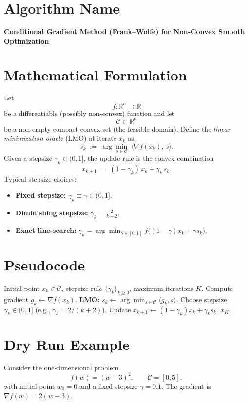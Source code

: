 \documentclass{article}
\begin{document}
\section*{Algorithm Name}
\textbf{Conditional Gradient Method (Frank–Wolfe) for Non‑Convex Smooth Optimization}

\section*{Mathematical Formulation}
Let 
\[
f:\mathbb{R}^{n}\rightarrow\mathbb{R}
\]
be a differentiable (possibly non‑convex) function and let 
\[
\mathcal{C}\subset\mathbb{R}^{n}
\]
be a non‑empty compact convex set (the feasible domain).  
Define the \emph{linear minimization oracle} (LMO) at iterate $x_k$ as
\[
s_k \;:=\; \arg\min_{s\in\mathcal{C}}\;\langle \nabla f(x_k),\,s\rangle .
\tag{1}
\]
Given a stepsize $\gamma_k\in(0,1]$, the update rule is the convex combination
\[
x_{k+1}\;=\;(1-\gamma_k)\,x_k+\gamma_k\,s_k .
\tag{2}
\]
Typical stepsize choices:
\begin{itemize}
\item \textbf{Fixed stepsize:} $\gamma_k\equiv\gamma\in(0,1]$.
\item \textbf{Diminishing stepsize:} $\displaystyle \gamma_k=\frac{2}{k+2}$.
\item \textbf{Exact line‑search:} $\displaystyle \gamma_k=\arg\min_{\gamma\in[0,1]} f\!\big((1-\gamma)x_k+\gamma s_k\big)$.
\end{itemize}

\section*{Pseudocode}
\begin{algorithm}[H]
\caption{Frank–Wolfe for Non‑Convex Smooth Problems}
\begin{algorithmic}[1]
\REQUIRE Initial point $x_0\in\mathcal{C}$, stepsize rule $\{\gamma_k\}_{k\ge 0}$, maximum iterations $K$.
    \STATE Compute gradient $g_k \gets \nabla f(x_k)$.
    \STATE \textbf{LMO:} $s_k \gets \arg\min_{s\in\mathcal{C}}\langle g_k, s\rangle$.
    \STATE Choose stepsize $\gamma_k\in(0,1]$ (e.g., $\gamma_k=2/(k+2)$).
    \STATE Update $x_{k+1}\gets (1-\gamma_k)x_k+\gamma_k s_k$.
\ENDFOR
\RETURN $x_K$.
\end{algorithmic}
\end{algorithm}

\section*{Dry Run Example}
Consider the one‑dimensional problem  
\[
f(w)=(w-3)^2 ,\qquad \mathcal{C}=[0,5],
\]
with initial point $w_0=0$ and a fixed stepsize $\gamma=0.1$.  
The gradient is $\nabla f(w)=2(w-3)$.
\end{document}
